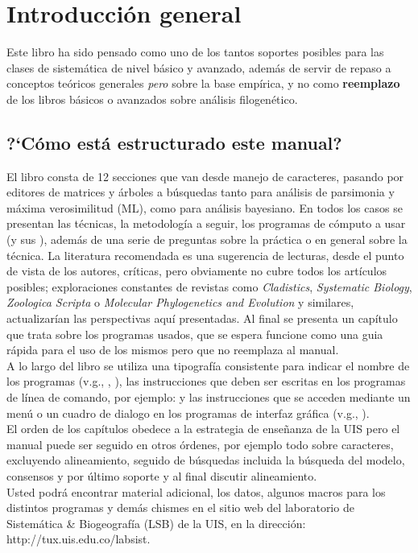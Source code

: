 \thispagestyle{empty}
\pagestyle{fancy}
\fancyhead{}
\fancyfoot{}
\renewcommand{\chaptername}{}
\fancyfoot[CE,CO]{\thepage}
\chapter{Introducci\'on general}
Este libro ha sido pensado como uno de los tantos soportes posibles para las clases de sistem\'atica de nivel b\'asico y avanzado, adem\'as de servir de repaso a conceptos te\'oricos generales \textit{pero} sobre la base emp\'irica, y no como \textbf{reemplazo} de los 
libros b\'asicos o avanzados sobre an\'alisis filogen\'etico.
\section*{?`C\'omo est\'a estructurado este manual?}
El libro consta de 12 secciones que van desde manejo de caracteres, pasando por editores de matrices y \'arboles a b\'usquedas tanto para an\'alisis de parsimonia y m\'axima verosimilitud (ML), como para an\'alisis bayesiano. En todos los casos se presentan las t\'ecnicas, la metodolog\'ia a seguir, los programas de c\'omputo a usar (y sus ), adem\'as de una serie de preguntas sobre la pr\'actica o en general sobre la t\'ecnica. La literatura recomendada es una sugerencia de lecturas, desde el punto de vista de los autores, cr\'iticas, pero obviamente no cubre todos los art\'iculos posibles; exploraciones constantes de revistas como \textit{Cladistics}, \textit{Systematic Biology}, \textit{Zoologica Scripta} o \textit{Molecular Phylogenetics and Evolution} y similares, actualizar\'ian las perspectivas aqu\'i presentadas. Al final se presenta un cap\'itulo que trata sobre los programas usados, que se espera funcione como una guia r\'apida para el uso de los mismos pero que no reemplaza al manual.\\
A lo largo del libro se utiliza una tipograf\'ia consistente para indicar el nombre de los programas (v.g., , ), las instrucciones que deben ser escritas en los programas de l\'inea de comando, por ejemplo:  
y las instrucciones que se acceden mediante un men\'u o un cuadro de dialogo en los programas de interfaz gr\'afica (v.g., ).\\

El orden de los cap\'itulos obedece a la estrategia de ense\~nanza de la UIS pero  el manual puede ser seguido en otros \'ordenes, por ejemplo todo sobre caracteres, excluyendo alineamiento, seguido de b\'usquedas incluida la b\'usqueda del modelo, consensos y por \'ultimo soporte y al final discutir alineamiento.\\ 
Usted podr\'a encontrar material adicional, los datos, algunos macros para los distintos programas y dem\'as chismes en el sitio web del laboratorio de Sistem\'atica \& Biogeograf\'ia (LSB) de la UIS, en la direcci\'on: http://tux.uis.edu.co/labsist.

